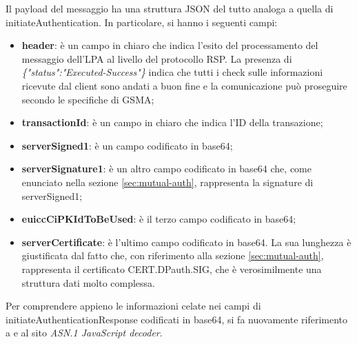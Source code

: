 \documentclass[10pt, oneside]{book}
\begin{document}
Il payload del messaggio ha una struttura JSON del tutto analoga a quella di initiateAuthentication. In particolare, si hanno i seguenti campi:
\begin{itemize}
\item \textbf{header}: è un campo in chiaro che indica l'esito del processamento del messaggio dell'LPA al livello del protocollo RSP. La presenza di \textit{\{"status":"Executed-Success"\}} indica che tutti i check sulle informazioni ricevute dal client sono andati a buon fine e la comunicazione può proseguire secondo le specifiche di GSMA;
\item \textbf{transactionId}: è un campo in chiaro che indica l'ID della transazione;
\item \textbf{serverSigned1}: è un campo codificato in base64;
\item \textbf{serverSignature1}: è un altro campo codificato in base64 che, come enunciato nella sezione \ref{sec:mutual-auth}, rappresenta la signature di serverSigned1;
\item \textbf{euiccCiPKIdToBeUsed}: è il terzo campo codificato in base64;
\item \textbf{serverCertificate}: è l'ultimo campo codificato in base64. La sua lunghezza è giustificata dal fatto che, con riferimento alla sezione \ref{sec:mutual-auth}, rappresenta il certificato CERT.DPauth.SIG, che è verosimilmente una struttura dati molto complessa.
\end{itemize}
Per comprendere appieno le informazioni celate nei campi di initiateAuthenticationResponse codificati in base64, si fa nuovamente riferimento a \cite{RSP-definitions} e al sito \textit{ASN.1 JavaScript decoder}.\\
\end{document}
